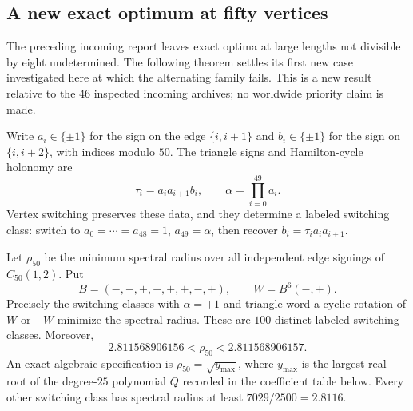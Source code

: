 \subsection{A new exact optimum at fifty vertices}
The preceding incoming report leaves exact optima at large lengths not
divisible by eight undetermined. The following theorem settles its first
new case investigated here at which the alternating family fails. This is
a new result relative to the 46 inspected incoming archives; no worldwide
priority claim is made.

Write $a_i\in\{\pm1\}$ for the sign on the edge $\{i,i+1\}$ and
$b_i\in\{\pm1\}$ for the sign on $\{i,i+2\}$, with indices modulo $50$.
The triangle signs and Hamilton-cycle holonomy are
\[
 \tau_i=a_i a_{i+1}b_i,\qquad \alpha=\prod_{i=0}^{49}a_i.
\]
Vertex switching preserves these data, and they determine a labeled
switching class: switch to $a_0=\cdots=a_{48}=1$, $a_{49}=\alpha$,
then recover $b_i=\tau_i a_i a_{i+1}$.

\begin{theorem}
Let $\rho_{50}$ be the minimum spectral radius over all independent edge
signings of $C_{50}(1,2)$. Put
\[
 B=(-,-,+,-,+,+,-,+),\qquad W=B^6(-,+).
\]
Precisely the switching classes with $\alpha=+1$ and triangle word a
cyclic rotation of $W$ or $-W$ minimize the spectral radius. These are
$100$ distinct labeled switching classes. Moreover,
\[
  \boxed{2.811568906156<\rho_{50}<2.811568906157.}
\]
An exact algebraic specification is
$\rho_{50}=\sqrt{y_{\max}}$, where $y_{\max}$ is the largest real root
of the degree-$25$ polynomial $Q$ recorded in the coefficient table below.
Every other switching class has spectral radius at least
$7029/2500=2.8116$.
\end{theorem}

